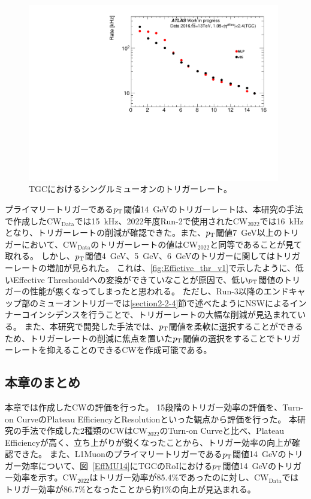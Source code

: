 \begin{figure}[tb]
  \centering
  \includegraphics[clip, width=11cm]{fig/5/15rate.pdf}
  \caption{TGCにおけるシングルミューオンのトリガーレート。}
  \label{fig:Ratev05v06}
\end{figure}
プライマリートリガーである$p_{\rm{T}}$閾値14~GeVのトリガーレートは、本研究の手法で作成した$\mathrm{CW_{Data}}$では15~kHz、2022年度Run-2で使用された$\mathrm{CW_{2022}}$では16~kHzとなり、トリガーレートの削減が確認できた。また、$p_{\rm{T}}$閾値7~GeV以上のトリガーにおいて、$\mathrm{CW_{Data}}$のトリガーレートの値は$\mathrm{CW_{2022}}$と同等であることが見て取れる。
しかし、$p_{\rm{T}}$閾値4~GeV、5~GeV、6~GeVのトリガーに関してはトリガーレートの増加が見られた。
これは、\ref{fig:Effictive_thr_v1}で示したように、低いEffective Threshouldへの変換ができていなことが原因で、低い$p_{\rm{T}}$閾値のトリガーの性能が悪くなってしまったと思われる。
ただし、Run-3以降のエンドキャップ部のミューオントリガーでは\ref{section2-2-4}節で述べたようにNSWによるインナーコインシデンスを行うことで、トリガーレートの大幅な削減が見込まれている。
また、本研究で開発した手法では、$p_{\rm{T}}$閾値を柔軟に選択することができるため、トリガーレートの削減に焦点を置いた$p_{\rm{T}}$閾値の選択をすることでトリガーレートを抑えることのできるCWを作成可能である。



\subsection{本章のまとめ}
本章では作成したCWの評価を行った。
15段階のトリガー効率の評価を、Turn-on CurveのPlateau EfficiencyとResolutionといった観点から評価を行った。
本研究の手法で作成した2種類のCWは$\mathrm{CW_{2022}}$のTurn-on Curveと比べ、Plateau Efficiencyが高く、立ち上がりが鋭くなったことから、トリガー効率の向上が確認できた。
また、L1Muonのプライマリートリガーである$p_{\rm{T}}$閾値14~GeVのトリガー効率について、図~\ref{EffMU14}にTGCのRoIにおける$p_{\rm{T}}$閾値14~GeVのトリガー効率を示す。$\mathrm{CW_{2022}}$はトリガー効率が85.4$\%$であったのに対し、$\mathrm{CW_{Data}}$ではトリガー効率が86.7$\%$となったことから約1$\%$の向上が見込まれる。

